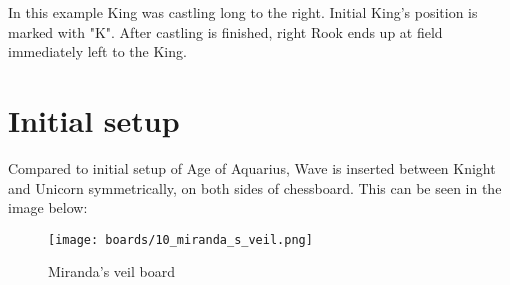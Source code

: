In this example King was castling long to the right. Initial King's position is marked with "K".
After castling is finished, right Rook ends up at field immediately left to the King.

\clearpage %

\section*{Initial setup}
\label{sec:Miranda's veil/Initial setup}

Compared to initial setup of Age of Aquarius, Wave is inserted between Knight and Unicorn
symmetrically, on both sides of chessboard. This can be seen in the image below:

\noindent
\begin{figure}[h]
\texttt{[image: boards/10\_miranda\_s\_veil.png]}
\caption{Miranda's veil board}
\label{fig:10_miranda_s_veil}
\end{figure}

\clearpage %
